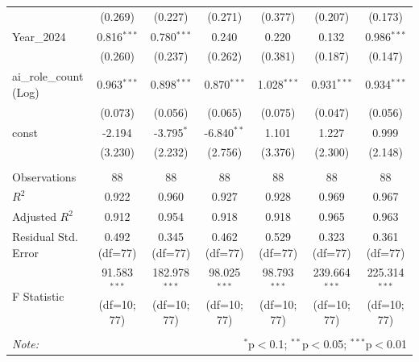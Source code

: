 \begin{table}[!htbp]
\begin{tabular}{@{\extracolsep{5pt}}lcccccc}
& (0.269) & (0.227) & (0.271) & (0.377) & (0.207) & (0.173) \\
 Year_2024 & 0.816$^{***}$ & 0.780$^{***}$ & 0.240$^{}$ & 0.220$^{}$ & 0.132$^{}$ & 0.986$^{***}$ \\
& (0.260) & (0.237) & (0.262) & (0.381) & (0.187) & (0.147) \\
 ai_role_count (Log) & 0.963$^{***}$ & 0.898$^{***}$ & 0.870$^{***}$ & 1.028$^{***}$ & 0.931$^{***}$ & 0.934$^{***}$ \\
& (0.073) & (0.056) & (0.065) & (0.075) & (0.047) & (0.056) \\
 const & -2.194$^{}$ & -3.795$^{*}$ & -6.840$^{**}$ & 1.101$^{}$ & 1.227$^{}$ & 0.999$^{}$ \\
& (3.230) & (2.232) & (2.756) & (3.376) & (2.300) & (2.148) \\
\hline \\[-1.8ex]
 Observations & 88 & 88 & 88 & 88 & 88 & 88 \\
 $R^2$ & 0.922 & 0.960 & 0.927 & 0.928 & 0.969 & 0.967 \\
 Adjusted $R^2$ & 0.912 & 0.954 & 0.918 & 0.918 & 0.965 & 0.963 \\
 Residual Std. Error & 0.492 (df=77) & 0.345 (df=77) & 0.462 (df=77) & 0.529 (df=77) & 0.323 (df=77) & 0.361 (df=77) \\
 F Statistic & 91.583$^{***}$ (df=10; 77) & 182.978$^{***}$ (df=10; 77) & 98.025$^{***}$ (df=10; 77) & 98.793$^{***}$ (df=10; 77) & 239.664$^{***}$ (df=10; 77) & 225.314$^{***}$ (df=10; 77) \\
\hline
\hline \\[-1.8ex]
\textit{Note:} & \multicolumn{6}{r}{$^{*}$p$<$0.1; $^{**}$p$<$0.05; $^{***}$p$<$0.01} \\
\end{tabular}
\end{table}